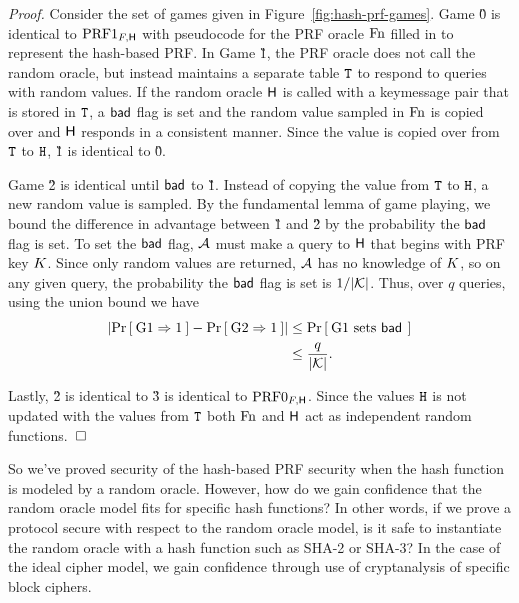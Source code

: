 \emph{Proof.}
Consider the set of games given in Figure~\ref{fig:hash-prf-games}.
Game \G0 is identical to $\PRF1_{\prf,\Horacle}$ with pseudocode for the PRF oracle $\Fn$ filled in to represent the hash-based PRF.
In Game \G1, the PRF oracle does not call the random oracle, but instead maintains a separate table $\TabT$ to respond to queries with random values.
If the random oracle $\Horacle$ is called with a key\dash message pair that is stored in $\TabT$, a $\bad$ flag is set and the random value sampled in $\Fn$ is copied over and $\Horacle$ responds in a consistent manner.
Since the value is copied over from $\TabT$ to $\TabH$, \G1 is identical to \G0.

Game \G2 is identical until $\bad$ to \G1.
Instead of copying the value from $\TabT$ to $\TabH$, a new random value is sampled.
By the fundamental lemma of game playing, we bound the difference in advantage between \G1 and \G2 by the probability the $\bad$ flag is set.
To set the $\bad$ flag, $\advA$ must make a query to $\Horacle$ that begins with PRF key $\prfkey$.
Since only random values are returned, $\advA$ has no knowledge of $\prfkey$, so on any given query, the probability the $\bad$ flag is set is $1/\abs{\keyspace}$.
Thus, over $q$ queries, using the union bound we have
\begin{align*}
	\absv*{\Prob{\G1\Rightarrow 1} - \Prob{\G2\Rightarrow1}} &\le \Prob{\G1 \setsbad}\\
  &\le \frac{q}{\abs{\keyspace}}.
\end{align*}

Lastly, \G2 is identical to \G3 is identical to $\PRF0_{\prf,\Horacle}$.
Since the values $\TabH$ is not updated with the values from $\TabT$ both $\Fn$ and $\Horacle$ act as independent random functions.\hfill$\dqed$

So we've proved security of the hash-based PRF security when the hash function is modeled by a random oracle.
However, how do we gain confidence that the random oracle model fits for specific hash functions?
In other words, if we prove a protocol secure with respect to the random oracle model, is it safe to instantiate the random oracle with a hash function such as SHA-2 or SHA-3?
In the case of the ideal cipher model, we gain confidence through use of cryptanalysis of specific block ciphers.

